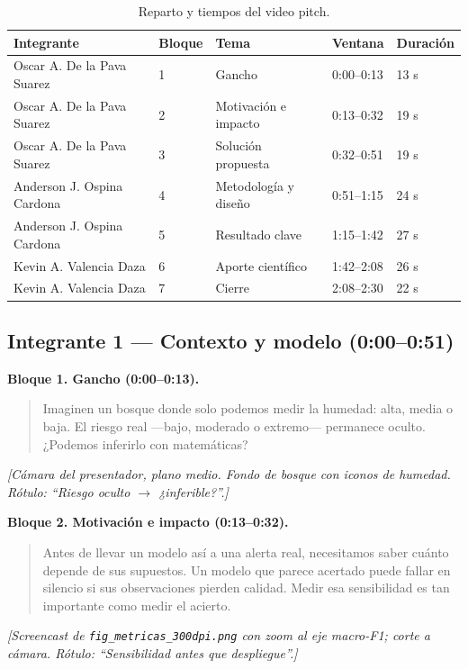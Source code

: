 \documentclass[11pt,letterpaper]{article}
\begin{document}
\begin{table}[H]
\centering
\caption{Reparto y tiempos del video pitch.}
\label{tab:pitch}
\small
\begin{tabular}{@{}p{4.6cm}p{1.1cm}p{3.4cm}p{1.9cm}p{1.3cm}@{}}
\toprule
Integrante & Bloque & Tema & Ventana & Duración\\
\midrule
Oscar A. De la Pava Suarez & 1 & Gancho & 0:00--0:13 & 13 s\\
Oscar A. De la Pava Suarez & 2 & Motivación e impacto & 0:13--0:32 & 19 s\\
Oscar A. De la Pava Suarez & 3 & Solución propuesta & 0:32--0:51 & 19 s\\
Anderson J. Ospina Cardona & 4 & Metodología y diseño & 0:51--1:15 & 24 s\\
Anderson J. Ospina Cardona & 5 & Resultado clave & 1:15--1:42 & 27 s\\
Kevin A. Valencia Daza & 6 & Aporte científico & 1:42--2:08 & 26 s\\
Kevin A. Valencia Daza & 7 & Cierre & 2:08--2:30 & 22 s\\
\bottomrule
\end{tabular}
\end{table}

\subsection*{Integrante 1 --- Contexto y modelo (0:00--0:51)}

\textbf{Bloque 1. Gancho (0:00--0:13).}
\begin{quote}\small
Imaginen un bosque donde solo podemos medir la humedad: alta, media o baja. El riesgo real ---bajo, moderado o extremo--- permanece oculto. ¿Podemos inferirlo con matemáticas?
\end{quote}
\noindent\emph{[Cámara del presentador, plano medio. Fondo de bosque con iconos de humedad. Rótulo: ``Riesgo oculto $\rightarrow$ ¿inferible?''.]}

\medskip
\textbf{Bloque 2. Motivación e impacto (0:13--0:32).}
\begin{quote}\small
Antes de llevar un modelo así a una alerta real, necesitamos saber cuánto depende de sus supuestos. Un modelo que parece acertado puede fallar en silencio si sus observaciones pierden calidad. Medir esa sensibilidad es tan importante como medir el acierto.
\end{quote}
\noindent\emph{[Screencast de \texttt{fig\_metricas\_300dpi.png} con zoom al eje macro-F1; corte a cámara. Rótulo: ``Sensibilidad antes que despliegue''.]}
\end{document}
